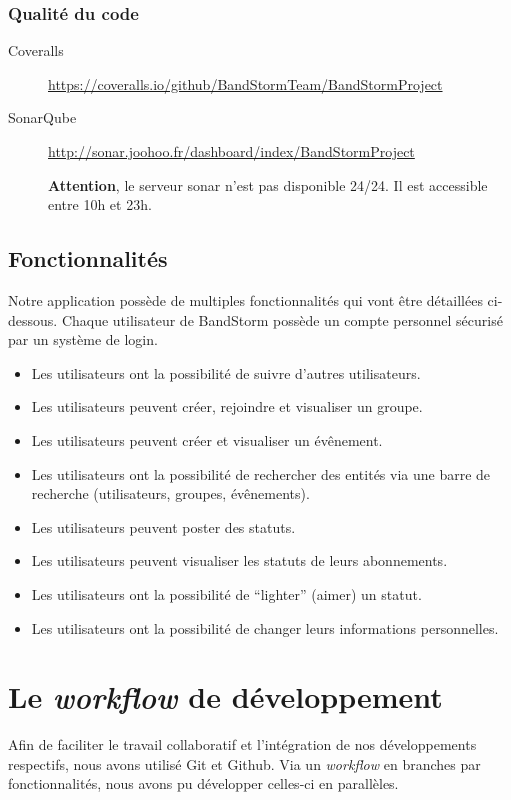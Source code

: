 \documentclass[12pt,a4paper,oneside]{book}
\begin{document}
	\subsection{Qualité du code}
	\begin{description}
		\item[Coveralls] \url{https://coveralls.io/github/BandStormTeam/BandStormProject}
		\item[SonarQube] \url{http://sonar.joohoo.fr/dashboard/index/BandStormProject}~\\
			\begin{attention}
				\textbf{Attention}, le serveur sonar n'est pas disponible 24/24. Il est accessible entre 10h et 23h.
			\end{attention}
	\end{description}


	\section{Fonctionnalités}
	Notre application possède de multiples fonctionnalités qui vont être détaillées ci-dessous.
	Chaque utilisateur de BandStorm possède un compte personnel sécurisé par un système de login.
	
	\begin{itemize}
		\item Les utilisateurs ont la possibilité de suivre d’autres utilisateurs.
		\item Les utilisateurs peuvent créer, rejoindre et visualiser un groupe.
		\item Les utilisateurs peuvent créer et visualiser un évênement.
		\item Les utilisateurs ont la possibilité de rechercher des entités via une barre de recherche (utilisateurs, groupes, évênements).
		\item Les utilisateurs peuvent poster des statuts.
		\item Les utilisateurs peuvent visualiser les statuts de leurs abonnements.
		\item Les utilisateurs ont la possibilité de “lighter” (aimer) un statut.
		\item Les utilisateurs ont la possibilité de changer leurs informations personnelles.
	\end{itemize}	
	
	\chapter{Le \textit{workflow} de développement}
	Afin de faciliter le travail collaboratif et l'intégration de nos développements respectifs, nous avons utilisé Git et Github. 
	Via un \textit{workflow} en branches par fonctionnalités, nous avons pu développer celles-ci en parallèles. 
	
\end{document}
